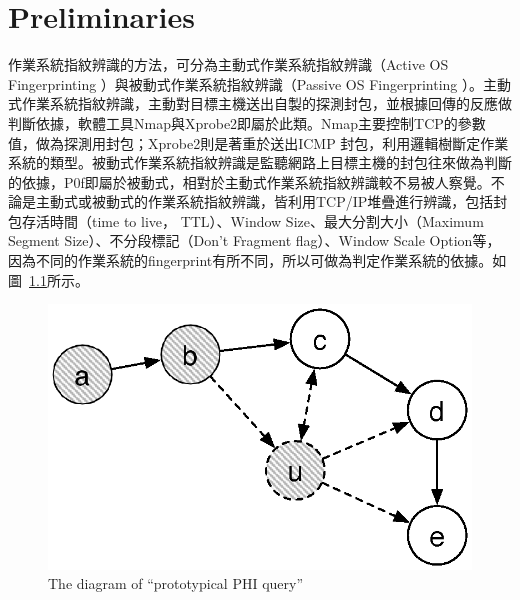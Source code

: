 \renewcommand\thetable{\arabic{chapter}-\arabic{table}}
\renewcommand{\theequation}{\arabic{chapter}-\arabic{equation}}
\chapter{Preliminaries}
\label{sec:preliminaries}

作業系統指紋辨識的方法，可分為主動式作業系統指紋辨識（Active OS Fingerprinting ）與被動式作業系統指紋辨識（Passive OS Fingerprinting ）。主動式作業系統指紋辨識，主動對目標主機送出自製的探測封包，並根據回傳的反應做判斷依據，軟體工具Nmap與Xprobe2即屬於此類。Nmap主要控制TCP的參數值，做為探測用封包；Xprobe2則是著重於送出ICMP 封包，利用邏輯樹斷定作業系統的類型。被動式作業系統指紋辨識是監聽網路上目標主機的封包往來做為判斷的依據，P0f即屬於被動式，相對於主動式作業系統指紋辨識較不易被人察覺。不論是主動式或被動式的作業系統指紋辨識，皆利用TCP/IP堆疊進行辨識，包括封包存活時間（time to live， TTL）、Window Size、最大分割大小（Maximum Segment Size）、不分段標記（Don't Fragment flag）、Window Scale Option等，因為不同的作業系統的fingerprint有所不同，所以可做為判定作業系統的依據。如圖~\ref{fig:PHI}所示。


\begin{figure}[hbtp]
  \begin{center}
    \includegraphics[width=1.0\textwidth]{figures/dyna_rm.eps}
    \caption{The diagram of ``prototypical PHI query''} 
    \label{fig:PHI}
  \end{center}
\end{figure}
